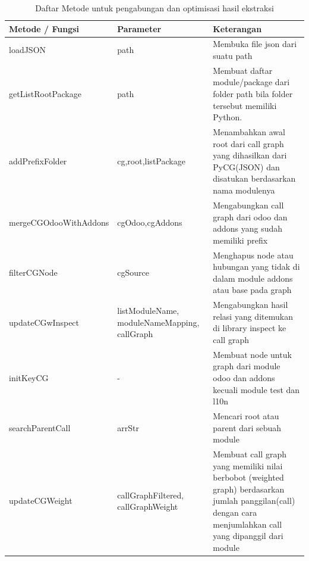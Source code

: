 \begingroup
\setlength{\LTleft}{-20cm plus -1fill}
\setlength{\LTright}{\LTleft}
\begin{small}
	\begin{longtable}{|p{4cm}|p{3cm}|p{6cm}|}
		\caption{Daftar Metode untuk pengabungan dan optimisasi hasil ekstraksi}\\
		\hline
		\textbf{Metode / Fungsi} & \textbf{Parameter} & \textbf{Keterangan}\\
		\endfirsthead
		
		\hline  

		loadJSON
		& path
		 & Membuka file json dari suatu path  \\

		 \hline  

		 getListRootPackage
		& path
		 & Membuat daftar module/package dari folder path bila folder tersebut memiliki Python. \\

		 \hline  

		 addPrefixFolder
		& cg,root,listPackage
		 & Menambahkan awal root dari call graph yang dihasilkan dari PyCG(JSON) dan disatukan berdasarkan nama modulenya  \\
		 

		 \hline  

		 mergeCGOdooWithAddons
		& cgOdoo,cgAddons
		 & Mengabungkan call graph dari odoo dan addons yang sudah memiliki prefix  \\


		 \hline  

		 filterCGNode
		& cgSource
		 & Menghapus node atau hubungan yang tidak di dalam module addons atau base pada graph \\

		 \hline
		
		 updateCGwInspect
		& listModuleName, moduleNameMapping, callGraph
		 & Mengabungkan hasil relasi yang ditemukan di library inspect ke call graph  \\

		 \hline
		 initKeyCG
		 
			& -
		 & Membuat node untuk graph dari module odoo dan addons kecuali module test dan l10n  \\
		 
		 \hline
		 searchParentCall
		 
			& arrStr
		 & Mencari root atau parent dari sebuah module\\

		 \hline
		
		 updateCGWeight
		& callGraphFiltered, callGraphWeight
		 & Membuat call graph yang memiliki nilai berbobot (weighted graph) berdasarkan jumlah panggilan(call) dengan cara menjumlahkan call yang dipanggil dari module \\


\end{longtable}
\end{small}
